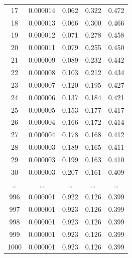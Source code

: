 \documentclass[a4paper,12pt]{article} %
\begin{document}
\begin{table}[ht]
\begin{tabular}{|c|c|c|c|c|}
            17 & 0.000014 & 0.062 & 0.322 & 0.472 \\
            18 & 0.000013 & 0.066 & 0.300 & 0.466 \\
            19 & 0.000012 & 0.071 & 0.278 & 0.458 \\
            20 & 0.000011 & 0.079 & 0.255 & 0.450 \\
            21 & 0.000009 & 0.089 & 0.232 & 0.442 \\
            22 & 0.000008 & 0.103 & 0.212 & 0.434 \\
            23 & 0.000007 & 0.120 & 0.195 & 0.427 \\
            24 & 0.000006 & 0.137 & 0.184 & 0.421 \\
            25 & 0.000005 & 0.153 & 0.177 & 0.417 \\
            26 & 0.000004 & 0.166 & 0.172 & 0.414 \\
            27 & 0.000004 & 0.178 & 0.168 & 0.412 \\
            28 & 0.000003 & 0.189 & 0.165 & 0.411 \\
            29 & 0.000003 & 0.199 & 0.163 & 0.410 \\
            30 & 0.000003 & 0.207 & 0.161 & 0.409 \\
            \ldots & \ldots & \ldots & \ldots & \ldots \\
            996 & 0.000001 & 0.922 & 0.126 & 0.399 \\
997 & 0.000001 & 0.923 & 0.126 & 0.399 \\
998 & 0.000001 & 0.923 & 0.126 & 0.399 \\
999 & 0.000001 & 0.923 & 0.126 & 0.399 \\
1000 & 0.000001 & 0.923 & 0.126 & 0.399 \\
\hline
\end{tabular}
\end{table}
\end{document}
